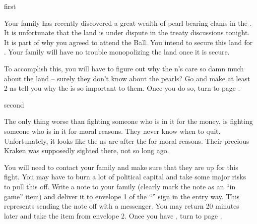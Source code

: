 \documentclass[greennotebook]{NeptuneBall}
\begin{document}

\startnotebook{\nGazaStrip{}}

\begin{page}{first}

Your family has recently discovered a great wealth of pearl bearing clams in the \pGazaStrip{}. It is unfortunate that the land is under dispute in the treaty discussions tonight. It is part of why you agreed to attend the \cExExKing{} Ball. You intend to secure this land for \pAtlantis{}. Your family will have no trouble monopolizing the land once it is secure. 

To accomplish this, you will have to figure out why the \pPacifica{}n's care so damn much about the land -- surely they don't know about the pearls? Go and make at least 2 \pPacifica{}ns tell you why the \pGazaStrip{} is so important to them. Once you do so, turn to page .

\end{page}

\begin{page}{second}

The only thing worse than fighting someone who is in it for the money, is fighting someone who is in it for moral reasons. They never know when to quit. Unfortunately, it looks like the \pPacifica{}ns are after the \pGazaStrip{} for moral reasons. Their precious Kraken was supposedly sighted there, not so long ago.

You will need to contact your family and make sure that they are up for this fight. You may have to burn a lot of political capital and take some major risks to pull this off. Write a note to your family (clearly mark the note as an ``in game'' item) and deliver it to envelope 1 of the ``\sFamily{}'' sign in the entry way. This represents sending the note off with a messenger. You may return 20 minutes later and take the item from envelope 2. Once you have \iCipherLetter{}, turn to page .

\end{page}
\end{document}
